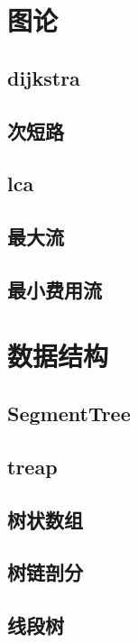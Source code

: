 \documentclass[twocolumn,a4,twoside]{article}
\begin{document}
	\section{图论}
		\subsection{dijkstra}
		
		\subsection{次短路}
		
		\subsection{lca}
		
		\subsection{最大流}
		
		\subsection{最小费用流}
		
	
	\section{数据结构}
		\subsection{SegmentTree}
		
		\subsection{treap}
		
		\subsection{树状数组}
		
		\subsection{树链剖分}
		
		\subsection{线段树}
		
	
\end{document}
